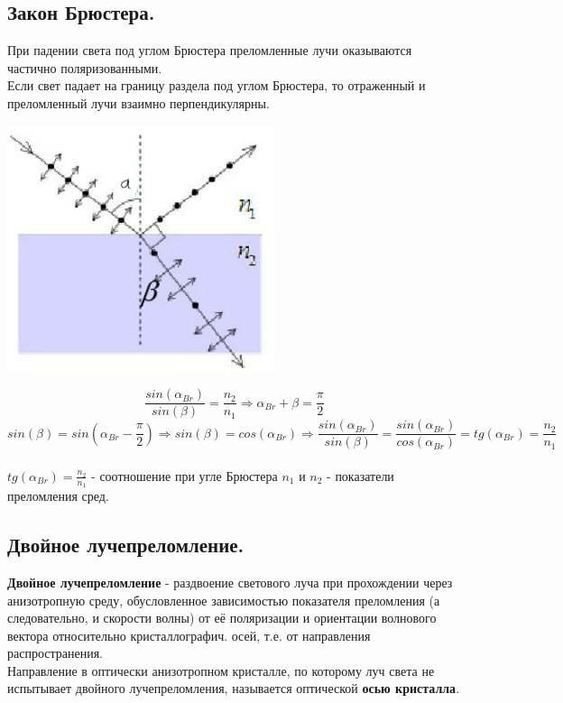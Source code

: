\documentclass[12pt]{report}
\begin{document}
\subsection{  Закон Брюстера.}
При падении света под углом Брюстера преломленные лучи оказываются частично поляризованными.\\

Если свет падает на границу раздела под углом Брюстера, то отраженный и преломленный лучи взаимно перпендикулярны.

\begin{center}
    \includegraphics[scale=0.7]{graphics/30_1.png}
\end{center}

\[ \frac{sin(\alpha_{Br})}{sin(\beta)} = \frac{n_2}{n_1} \Rightarrow{}  \alpha_{Br}+\beta = \frac{\pi}{2} \]  \[ sin(\beta) = sin(\alpha_{Br} - \frac{\pi}{2}) \Rightarrow{} sin(\beta) = cos(\alpha_{Br}) \Rightarrow{} \frac{sin(\alpha_{Br})}{sin(\beta)} =
    \frac{sin(\alpha_{Br})}{cos(\alpha_{Br})} = tg(\alpha_{Br})=\frac{n_2}{n_1}\]\\
$tg(\alpha_{Br})=\frac{n_2}{n_1}$ - соотношение при угле Брюстера
$n_1$ и $n_2$ - показатели преломления сред.
\subsection{  Двойное лучепреломление.}
\textbf{Двойное лучепреломление} - раздвоение светового луча при прохождении через анизотропную среду, обусловленное зависимостью показателя преломления (а следовательно, и скорости волны) от её поляризации и ориентации волнового вектора относительно кристаллографич. осей, т.е. от направления распространения.\\

Направление в оптически анизотропном кристалле, по которому луч света не испытывает двойного лучепреломления, называется оптической \textbf{осью кристалла}.\\
\end{document}
